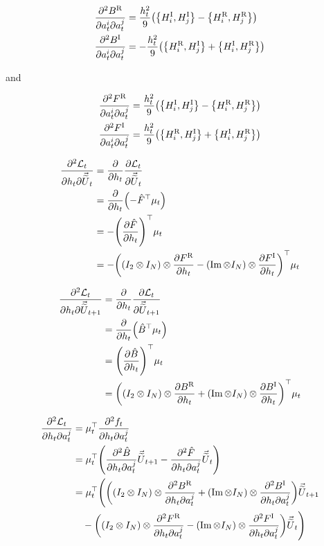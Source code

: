 \documentclass{article}
\newcommand{\isovecU}{\vec{\widetilde{U}}}
\newcommand{\HI}{H^{\text{I}}}
\newcommand{\HR}{H^{\text{R}}}
\newcommand{\BR}{B^{\text{R}}}
\newcommand{\BI}{B^{\text{I}}}
\newcommand{\FR}{F^{\text{R}}}
\newcommand{\FI}{F^{\text{I}}}
\begin{document}
\begin{align*}
  \pdv{\BR}{a^i_t}{a^j_t} &= \frac{h_t^2}{9}\qty(\qty{\HI_i, \HI_j} - \qty{\HR_i, \HR_j})\\
  \pdv{\BI}{a^i_t}{a^j_t} &= -\frac{h_t^2}{9}\qty(\qty{\HR_i, \HI_j} + \qty{\HI_i, \HR_j})\\
\end{align*}

and

\begin{align*}
  \pdv{\FR}{a^i_t}{a^j_t} &= \frac{h_t^2}{9}\qty(\qty{\HI_i, \HI_j} - \qty{\HR_i, \HR_j})\\
  \pdv{\FI}{a^i_t}{a^j_t} &= \frac{h_t^2}{9}\qty(\qty{\HR_i, \HI_j} + \qty{\HI_i, \HR_j})\\
\end{align*}

\begin{align*}
  \pdv{\mathcal{L}_t}{h_t}{\isovecU_t} &= \pdv{h_t} \pdv{\mathcal{L}_t}{\isovecU_t} \\
  &= \pdv{h_t} \qty(-\hat F^\top \mu_t) \\
  &= -\qty(\pdv{\hat F}{h_t})^\top \mu_t \\
  &= -\qty((I_2 \otimes I_N) \otimes \pdv{\FR}{h_t} - (\Im \otimes I_N) \otimes \pdv{\FI}{h_t})^\top \mu_t \\
\end{align*}

\begin{align*}
  \pdv{\mathcal{L}_t}{h_t}{\isovecU_{t+1}} &= \pdv{h_t} \pdv{\mathcal{L}_t}{\isovecU_{t+1}} \\
  &= \pdv{h_t} \qty(\hat B^\top \mu_t) \\
  &= \qty(\pdv{\hat B}{h_t})^\top \mu_t \\
  &= \qty((I_2 \otimes I_N) \otimes \pdv{\BR}{h_t} + (\Im \otimes I_N) \otimes \pdv{\BI}{h_t})^\top \mu_t \\
\end{align*}

\begin{align*}
  \pdv{\mathcal{L}_t}{h_t}{a^j_t} &= \mu_t^\top \pdv{f_t}{h_t}{a^j_t} \\
  &= \mu_t^\top \qty(\pdv{\hat B}{h_t}{a^j_t} \isovecU_{t+1} - \pdv{\hat F}{h_t}{a^j_t} \isovecU_t) \\
  &= \mu_t^\top \Bigg( \qty(\qty(I_2 \otimes I_N) \otimes \pdv{\BR}{h_t}{a^j_t} + (\Im \otimes I_N) \otimes \pdv{\BI}{h_t}{a^j_t}) \isovecU_{t+1} \\
  & \quad - \qty(\qty(I_2 \otimes I_N) \otimes \pdv{\FR}{h_t}{a^j_t} - \qty(\Im \otimes I_N) \otimes \pdv{\FI}{h_t}{a^j_t}) \isovecU_t \Bigg)
\end{align*}
\end{document}
